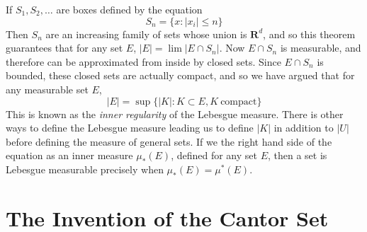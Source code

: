 \begin{remark}
  If $S_1, S_2, \dots$ are boxes defined by the equation
  \[ S_n = \{ x: |x_i| \leq n \} \]
  Then $S_n$ are an increasing family of sets whose union is $\mathbf{R}^d$, and so this theorem guarantees that for any set $E$, $|E| = \lim |E \cap S_n|$. Now $E \cap S_n$ is measurable, and therefore can be approximated from inside by closed sets. Since $E \cap S_n$ is bounded, these closed sets are actually compact, and so we have argued that for any measurable set $E$,
  \[ |E| = \sup \{ |K| : K \subset E, K\ \text{compact} \} \]
  This is known as the {\it inner regularity} of the Lebesgue measure. There is other ways to define the Lebesgue measure leading us to define $|K|$ in addition to $|U|$ before defining the measure of general sets. If we the right hand side of the equation as an inner measure $\mu_*(E)$, defined for any set $E$, then a set is Lebesgue measurable precisely when $\mu_*(E) = \mu^*(E)$.
\end{remark}

\section{The Invention of the Cantor Set}


